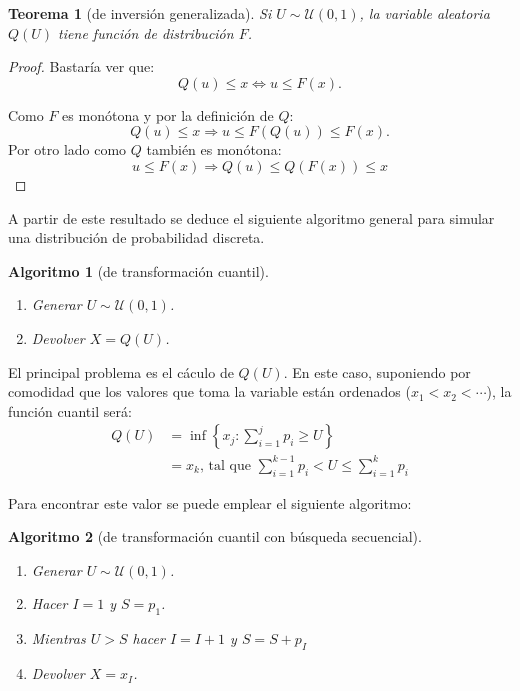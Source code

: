 \documentclass[
]{book}
\theoremstyle{break}
\newtheorem{theorem}{Teorema}[chapter]
\newtheorem{conjecture}{Algoritmo}[chapter]
\theoremstyle{definition}
\theoremstyle{definition}
\theoremstyle{definition}
\theoremstyle{definition}
\theoremstyle{remark}
\begin{document}
\begin{theorem}[de inversión generalizada]
\protect\hypertarget{thm:invgen}{}{\label{thm:invgen} {} }
Si \(U\sim \mathcal{U}\left( 0,1\right)\), la variable aleatoria \(Q\left( U\right)\)
tiene función de distribución \(F\).
\end{theorem}
\begin{proof}
{}
Bastaría ver que:
\[Q\left( u\right) \leq x \Longleftrightarrow u\leq F(x).\]

Como \(F\) es monótona y por la definición de \(Q\):
\[Q\left( u\right) \leq x \Rightarrow u \leq F(Q\left( u\right)) \leq F(x).\]
Por otro lado como \(Q\) también es monótona:
\[u \leq F(x) \Rightarrow Q\left( u\right) \leq Q(F(x)) \leq x\]
\end{proof}

A partir de este resultado se deduce el siguiente algoritmo general
para simular una distribución de probabilidad discreta.

\begin{conjecture}[de transformación cuantil]
\protect\hypertarget{cnj:unnamed-chunk-5}{}{\label{cnj:unnamed-chunk-5} {} }

\begin{enumerate}
\def\labelenumi{\arabic{enumi}.}
\item
  Generar \(U\sim \mathcal{U}\left( 0,1\right)\).
\item
  Devolver \(X=Q\left( U\right)\).
\end{enumerate}
\end{conjecture}

El principal problema es el cáculo de \(Q\left( U\right)\).
En este caso, suponiendo por comodidad que los valores que toma la variable
están ordenados (\(x_{1}<x_{2}<\cdots\)), la función cuantil será:
\[\begin{array}{ll}
Q\left( U\right) &=\inf \left\{ x_{j}:\sum_{i=1}^{j}p_{i}\geq U\right\} \\
&=x_{k}\text{, tal que }\sum_{i=1}^{k-1}p_{i}<U\leq \sum_{i=1}^{k}p_{i}
\end{array}\]

Para encontrar este valor se puede emplear el siguiente algoritmo:

\begin{conjecture}[de transformación cuantil con búsqueda secuencial]
\protect\hypertarget{cnj:unnamed-chunk-6}{}{\label{cnj:unnamed-chunk-6} {} }

\begin{enumerate}
\def\labelenumi{\arabic{enumi}.}
\item
  Generar \(U\sim \mathcal{U}\left( 0,1\right)\).
\item
  Hacer \(I=1\) y \(S=p_{1}\).
\item
  Mientras \(U>S\) hacer \(I=I+1\) y \(S=S+p_{I}\)
\item
  Devolver \(X=x_{I}\).
\end{enumerate}
\end{conjecture}
\end{document}
